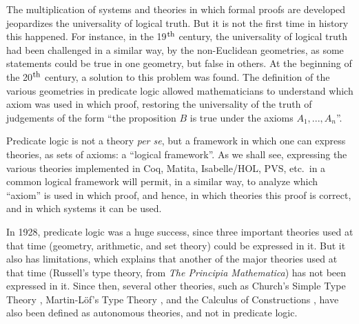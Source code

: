 
The multiplication of systems and theories in which formal proofs are
developed jeopardizes the universality of logical truth. But it is not
the first time in history this happened.  For instance, in the
19$^{\mbox{\footnotesize th}}$ century, the universality of logical
truth had been challenged in a similar way, by the non-Euclidean
geometries, as some statements could be true in one geometry, but
false in others. At the beginning of the 20$^{\mbox{\footnotesize
    th}}$ century, a solution to this problem was found.  The
definition of the various geometries in predicate logic
\cite{HilbertAckermann} allowed mathematicians to understand which
axiom was used in which proof, restoring the universality of the truth
of judgements of the form ``the proposition $B$ is true under the
axioms $A_1, ..., A_n$''.

Predicate logic is not a theory {\em per se}, but a framework in
which one can express theories, as sets of axioms: a ``logical
framework''. As we shall see, expressing the various theories
implemented in Coq, Matita, Isabelle/HOL, PVS, etc.\ in a common
logical framework will permit, in a similar way, to analyze which
``axiom'' is used in which proof, and hence, in which theories this
proof is correct, and in which systems it can be used.

In 1928, predicate logic was a huge success, since three important
theories used at that time (geometry, arithmetic, and set theory)
could be expressed in it. But it also has limitations, which explains
that another of the major theories used at that time (Russell's type
theory, from {\em The Principia Mathematica}) has not been expressed
in it. Since then, several other theories, such as Church's Simple Type
Theory \cite{Church40}, Martin-L\"of's Type Theory
\cite{Martin-Lof84}, and the Calculus of Constructions
\cite{CoquandHuet88}, have also been defined as autonomous theories,
and not in predicate logic.



